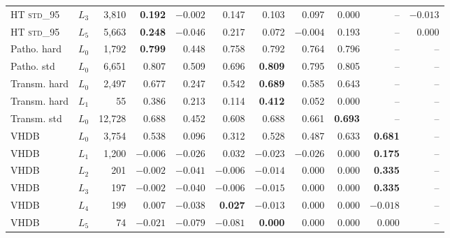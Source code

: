 \begin{table}[htbp]
{\begin{tabular}{ll r rrrrrrrr}
HT \textsc{std\_95} & $L_3$ & 3,810 & \textbf{0.192} & $\minus 0.002$ & 0.147 & 0.103 & 0.097 & 0.000 & -- & $\minus 0.013$ \\
HT \textsc{std\_95} & $L_5$ & 5,663 & \textbf{0.248} & $\minus 0.046$ & 0.217 & 0.072 & $\minus 0.004$ & 0.193 & -- & 0.000 \\
\addlinespace
Patho. hard & $L_0$ & 1,792 & \textbf{0.799} & 0.448 & 0.758 & 0.792 & 0.764 & 0.796 & -- & -- \\
\addlinespace
Patho. std & $L_0$ & 6,651 & 0.807 & 0.509 & 0.696 & \textbf{0.809} & 0.795 & 0.805 & -- & -- \\
\addlinespace
Transm. hard & $L_0$ & 2,497 & 0.677 & 0.247 & 0.542 & \textbf{0.689} & 0.585 & 0.643 & -- & -- \\
Transm. hard & $L_1$ & 55 & 0.386 & 0.213 & 0.114 & \textbf{0.412} & 0.052 & 0.000 & -- & -- \\
\addlinespace
Transm. std & $L_0$ & 12,728 & 0.688 & 0.452 & 0.608 & 0.688 & 0.661 & \textbf{0.693} & -- & -- \\
\addlinespace
VHDB & $L_0$ & 3,754 & 0.538 & 0.096 & 0.312 & 0.528 & 0.487 & 0.633 & \textbf{0.681} & -- \\
VHDB & $L_1$ & 1,200 & $\minus 0.006$ & $\minus 0.026$ & 0.032 & $\minus 0.023$ & $\minus 0.026$ & 0.000 & \textbf{0.175} & -- \\
VHDB & $L_2$ & 201 & $\minus 0.002$ & $\minus 0.041$ & $\minus 0.006$ & $\minus 0.014$ & 0.000 & 0.000 & \textbf{0.335} & -- \\
VHDB & $L_3$ & 197 & $\minus 0.002$ & $\minus 0.040$ & $\minus 0.006$ & $\minus 0.015$ & 0.000 & 0.000 & \textbf{0.335} & -- \\
VHDB & $L_4$ & 199 & 0.007 & $\minus 0.038$ & \textbf{0.027} & $\minus 0.013$ & 0.000 & 0.000 & $\minus 0.018$ & -- \\
VHDB & $L_5$ & 74 & $\minus 0.021$ & $\minus 0.079$ & $\minus 0.081$ & \textbf{0.000} & 0.000 & 0.000 & 0.000 & -- \\
\bottomrule
\end{tabular}}
\end{table}
